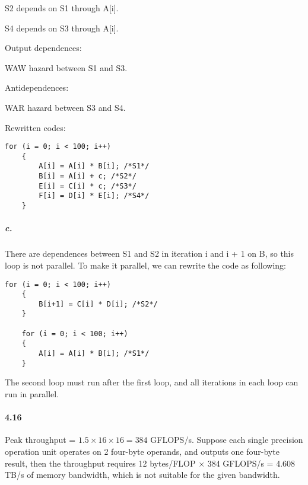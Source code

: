 \documentclass{article}
\begin{document}
S2 depends on S1 through A[i].

S4 depends on S3 through A[i].

Output dependences:

WAW hazard between S1 and S3.

Antidependences:

WAR hazard between S3 and S4.

Rewritten codes:

\begin{lstlisting}[mathescape=true]
    for (i = 0; i < 100; i++)
    {
        A[i] = A[i] * B[i]; /*S1*/
        B[i] = A[i] + c; /*S2*/
        E[i] = C[i] * c; /*S3*/
        F[i] = D[i] * E[i]; /*S4*/
    }
\end{lstlisting}

\subparagraph{c.}

There are dependences between S1 and S2 in iteration i and i + 1 on B, so this loop is not parallel. To make it parallel, we can rewrite the code as following:

\begin{lstlisting}[mathescape=true]
    for (i = 0; i < 100; i++)
    {
        B[i+1] = C[i] * D[i]; /*S2*/
    }

    for (i = 0; i < 100; i++)
    {
        A[i] = A[i] * B[i]; /*S1*/
    }
\end{lstlisting}

The second loop must run after the first loop, and all iterations in each loop can run in parallel.
\paragraph{4.16}

Peak throughput = $1.5\times 16\times 16 = 384$ GFLOPS/s. Suppose each single precision operation unit operates on 2 four-byte operands, and outputs one four-byte result, then the throughput requires 12 bytes/FLOP $\times$ 384 GFLOPS/s = 4.608 TB/s of memory bandwidth, which is not suitable for the given bandwidth.
\end{document}
